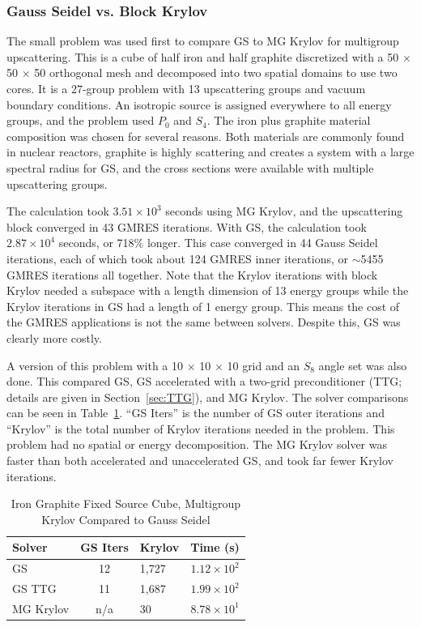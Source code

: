 \subsubsection{Gauss Seidel vs. Block Krylov}
The small problem was used first to compare GS to MG Krylov for multigroup upscattering. This is a cube of half iron and half graphite discretized with a 50 $\times$ 50 $\times$ 50 orthogonal mesh and decomposed into two spatial domains to use two cores. It is a 27-group problem with 13 upscattering groups and vacuum boundary conditions. An isotropic source is assigned everywhere to all energy groups, and the problem used $P_0$ and $S_4$. The iron plus graphite material composition was chosen for several reasons. Both materials are commonly found in nuclear reactors, graphite is highly scattering and creates a system with a large spectral radius for GS, and the cross sections were available with multiple upscattering groups.

The calculation took $3.51 \times 10^{3}$ seconds using MG Krylov, and the upscattering block converged in 43 GMRES iterations. With GS, the calculation took $2.87 \times 10^{4}$ seconds, or 718\% longer. This case converged in 44 Gauss Seidel iterations, each of which took about 124 GMRES inner iterations, or $\sim$5455 GMRES iterations all together. Note that the Krylov iterations with block Krylov needed a subspace with a length dimension of 13 energy groups while the Krylov iterations in GS had a length of 1 energy group. This means the cost of the GMRES applications is not the same between solvers. Despite this, GS was clearly more costly.

A version of this problem with a 10 $\times$ 10 $\times$ 10 grid and an $S_{8}$ angle set was also done. This compared GS, GS accelerated with a two-grid preconditioner (TTG; details are given in Section~\ref{sec:TTG}), and MG Krylov. The solver comparisons can be seen in Table~\ref{table:FeC GS Krylov}. ``GS Iters'' is the number of GS outer iterations and ``Krylov'' is the total number of Krylov iterations needed in the problem. This problem had no spatial or energy decomposition. The MG Krylov solver was faster than both accelerated and unaccelerated GS, and took far fewer Krylov iterations. 
%
\begin{table}[!h]
\caption{Iron Graphite Fixed Source Cube, Multigroup Krylov Compared to Gauss Seidel}
\begin{center}
\begin{tabular}{| l | c | l | c |}
\hline
Solver & GS Iters & Krylov & Time (s)\\[0.5ex]
\hline
GS &  12 & 1,727 & $1.12 \times 10^{2}$ \\
GS TTG & 11 & 1,687 & $1.99 \times 10^{2}$  \\
MG Krylov & n/a & 30 & $8.78 \times 10^{1}$ \\
\hline
\end{tabular}
\end{center}
\label{table:FeC GS Krylov}
\end{table}

